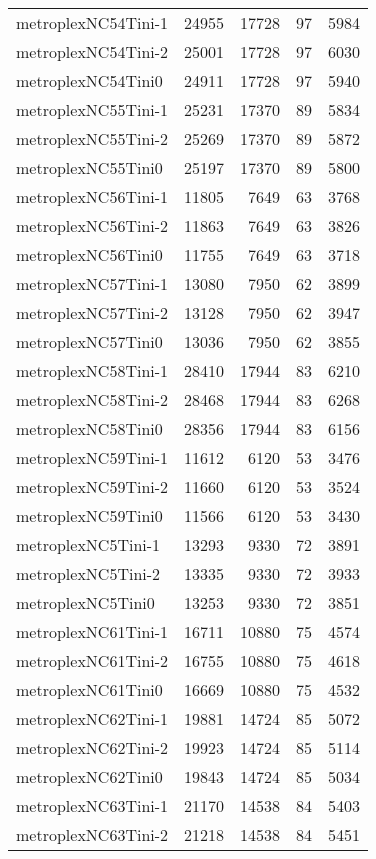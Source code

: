 \begin{longtable}{lrrrr}
metroplexNC54Tini-1 & 24955 & 17728 & 97 & 5984 \\
metroplexNC54Tini-2 & 25001 & 17728 & 97 & 6030 \\
metroplexNC54Tini0 & 24911 & 17728 & 97 & 5940 \\
metroplexNC55Tini-1 & 25231 & 17370 & 89 & 5834 \\
metroplexNC55Tini-2 & 25269 & 17370 & 89 & 5872 \\
metroplexNC55Tini0 & 25197 & 17370 & 89 & 5800 \\
metroplexNC56Tini-1 & 11805 & 7649 & 63 & 3768 \\
metroplexNC56Tini-2 & 11863 & 7649 & 63 & 3826 \\
metroplexNC56Tini0 & 11755 & 7649 & 63 & 3718 \\
metroplexNC57Tini-1 & 13080 & 7950 & 62 & 3899 \\
metroplexNC57Tini-2 & 13128 & 7950 & 62 & 3947 \\
metroplexNC57Tini0 & 13036 & 7950 & 62 & 3855 \\
metroplexNC58Tini-1 & 28410 & 17944 & 83 & 6210 \\
metroplexNC58Tini-2 & 28468 & 17944 & 83 & 6268 \\
metroplexNC58Tini0 & 28356 & 17944 & 83 & 6156 \\
metroplexNC59Tini-1 & 11612 & 6120 & 53 & 3476 \\
metroplexNC59Tini-2 & 11660 & 6120 & 53 & 3524 \\
metroplexNC59Tini0 & 11566 & 6120 & 53 & 3430 \\
metroplexNC5Tini-1 & 13293 & 9330 & 72 & 3891 \\
metroplexNC5Tini-2 & 13335 & 9330 & 72 & 3933 \\
metroplexNC5Tini0 & 13253 & 9330 & 72 & 3851 \\
metroplexNC61Tini-1 & 16711 & 10880 & 75 & 4574 \\
metroplexNC61Tini-2 & 16755 & 10880 & 75 & 4618 \\
metroplexNC61Tini0 & 16669 & 10880 & 75 & 4532 \\
metroplexNC62Tini-1 & 19881 & 14724 & 85 & 5072 \\
metroplexNC62Tini-2 & 19923 & 14724 & 85 & 5114 \\
metroplexNC62Tini0 & 19843 & 14724 & 85 & 5034 \\
metroplexNC63Tini-1 & 21170 & 14538 & 84 & 5403 \\
metroplexNC63Tini-2 & 21218 & 14538 & 84 & 5451 \\

\end{longtable}
